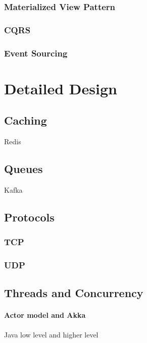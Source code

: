 \documentclass[a4paper, 11pt]{book}
\begin{document}
    \subsubsection{Materialized View Pattern}

    \subsubsection{CQRS}

    \subsubsection{Event Sourcing}


    \section{Detailed Design}

    \subsection{Caching}
    Redis

    \subsection{Queues}
    Kafka

    \subsection{Protocols}

    \subsubsection{TCP}

    \subsubsection{UDP}

    \subsection{Threads and Concurrency}

    \paragraph{Actor model and Akka}
    Java low level and higher level
\end{document}
